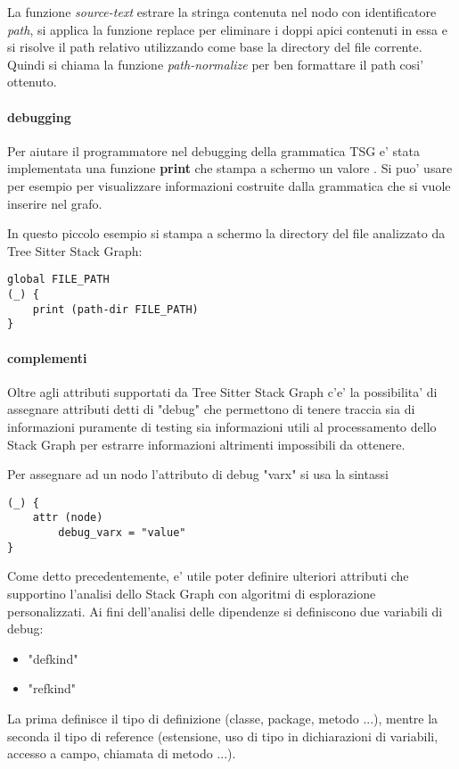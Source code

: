 La funzione \emph{source-text} estrare la stringa contenuta nel nodo con identificatore \emph{path}, si applica la funzione replace per eliminare i doppi apici contenuti in essa e si risolve il path relativo utilizzando come base la directory del file corrente.
Quindi si chiama la funzione \emph{path-normalize} per ben formattare il path cosi' ottenuto.

\paragraph{debugging}

Per aiutare il programmatore nel debugging della grammatica TSG e' stata implementata una funzione \textbf{print} che stampa a schermo un valore \cite{TreeSitterGraphReferenceDebugging}.
Si puo' usare per esempio per visualizzare informazioni costruite dalla grammatica che si vuole inserire nel grafo.

In questo piccolo esempio si stampa a schermo la directory del file analizzato da Tree Sitter Stack Graph:

\begin{Verbatim}[samepage=true]
global FILE_PATH
(_) {
    print (path-dir FILE_PATH)
}
\end{Verbatim}

\paragraph{complementi}

Oltre agli attributi supportati da Tree Sitter Stack Graph c'e' la possibilita' di assegnare attributi detti di "debug" \cite{TreeSitterStackGraphDebugInfo} che permettono di tenere traccia sia di informazioni puramente di testing sia informazioni utili al processamento dello Stack Graph per estrarre informazioni altrimenti impossibili da ottenere.

Per assegnare ad un nodo l'attributo di debug "varx" si usa la sintassi

\begin{Verbatim}[samepage=true]
(_) {
    attr (node)
        debug_varx = "value"
}
\end{Verbatim}

Come detto precedentemente, e' utile poter definire ulteriori attributi che supportino l'analisi dello Stack Graph con algoritmi di esplorazione personalizzati.
Ai fini dell'analisi delle dipendenze si definiscono due variabili di debug:

\begin{itemize}
    \item "defkind"
    \item "refkind"
\end{itemize}

La prima definisce il tipo di definizione (classe, package, metodo ...), mentre la seconda il tipo di reference (estensione, uso di tipo in dichiarazioni di variabili, accesso a campo, chiamata di metodo ...).
